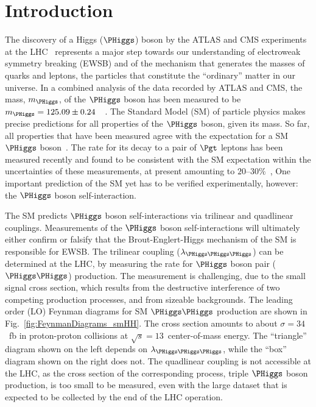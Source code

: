 \section{Introduction}
\label{sec:introduction}

The discovery of a Higgs ($\PHiggs$) boson by the ATLAS and CMS experiments at the LHC~\cite{Higgs-Discovery_CMS,Higgs-Discovery_ATLAS}
represents a major step towards our understanding of electroweak symmetry breaking (EWSB) 
and of the mechanism that generates the masses of quarks and leptons, the particles that constitute the ``ordinary'' matter in our universe.
In a combined analysis of the data recorded by ATLAS and CMS, 
the mass, $m_{\PHiggs}$, of the $\PHiggs$ boson has been measured to be $m_{\PHiggs} = 125.09 \pm 0.24$~\GeV~\cite{HIG-14-042}.
The Standard Model (SM) of particle physics makes precise predictions for all properties of the $\PHiggs$ boson, given its mass.
So far, all properties that have been measured agree with the expectation for a SM $\PHiggs$ boson~\cite{HIG-15-002}.
The rate for its decay to a pair of $\Pgt$ leptons has been measured recently
and found to be consistent with the SM expectation within the uncertainties of these measurements, 
at present amounting to $20$--$30\%$~\cite{HIG-13-004,Aad:2015vsa,HIG-15-002,HIG-16-043,ATLAS:2018lur},
One important prediction of the SM yet has to be verified experimentally, however:
the $\PHiggs$ boson self-interaction.

The SM predicts $\PHiggs$ boson self-interactions via trilinear and quadlinear couplings. 
Measurements of the $\PHiggs$ boson self-interactions will ultimately either confirm or falsify 
that the Brout-Englert-Higgs mechanism of the SM is responsible for EWSB. 
The trilinear coupling ($\lambda_{\PHiggs\PHiggs\PHiggs}$) can be determined at the LHC, 
by measuring the rate for $\PHiggs$ boson pair ($\PHiggs\PHiggs$) production. 
The measurement is challenging, due to the small signal cross section, 
which results from the destructive interference of two competing production processes, and from sizeable backgrounds. 
The leading order (LO) Feynman diagrams for SM $\PHiggs\PHiggs$ production are shown in Fig.~\ref{fig:FeynmanDiagrams_smHH}.
The cross section amounts to about $\sigma = 34$~fb in proton-proton collisions at $\sqrt{s}=13$~\TeV center-of-mass energy.
The ``triangle'' diagram shown on the left depends on $\lambda_{\PHiggs\PHiggs\PHiggs}$,
while the ``box'' diagram shown on the right does not.
The quadlinear coupling is not accessible at the LHC, as the cross section of the corresponding process, 
triple $\PHiggs$ boson production, is too small to be measured, 
even with the large dataset that is expected to be collected by the end of the LHC operation.

